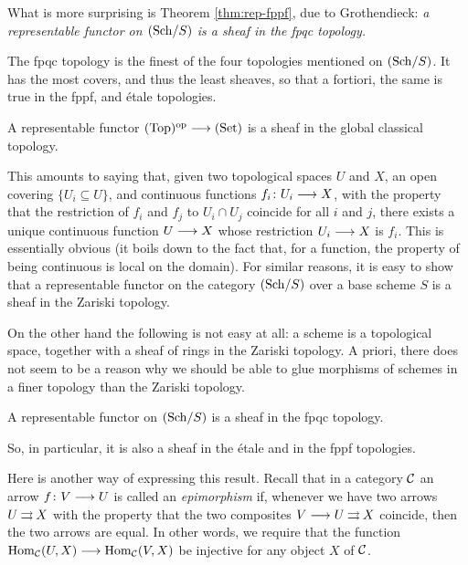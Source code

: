 \begin{2   CONTRAVARIANT FUNCTORS}
\begin{2.3 Sheaves in Grothendieck topologies}
\begin{shaded}
What is more surprising is Theorem \ref{thm:rep-fppf}, due to Grothendieck: 
\textit{a representable functor on $({\mathrm{Sch}/S})$ is a sheaf in the fpqc topology.}

The fpqc topology is the finest of the four topologies mentioned on $({\mathrm{Sch}/S})$. It has the most covers, and thus the least sheaves, so that a fortiori, the same is true in the fppf,  and \'etale topologies.
\end{shaded}


\begin{proposition}\label{prop:rep->sheaf}
A representable functor $\cattop\op \arr \catset$ is a sheaf in the global classical topology.
\end{proposition}

This amounts to saying that, given two topological spaces $U$ and $X$, an open covering $\{U_i \subseteq U\}$, and continuous functions $f_i \colon U_i \arr X$, with the property that the restriction of $f_i$ and $f_j$ to $U_i \cap U_j$ coincide for all $i$ and $j$, there exists a unique continuous function $U \arr X$ whose restriction $U_{i} \arr X$ is $f_{i}$. This is essentially obvious (it boils down to the fact that, for a function, the property of being continuous is local on the domain). For similar reasons, it is easy to show that a representable functor on the category $({\mathrm{Sch}/S})$ over a base scheme $S$ is a sheaf in the Zariski topology.

On the other hand the following is not easy at all: a scheme is a topological space, together with a sheaf of rings in the Zariski topology. A priori, there does not seem to be a reason why we should be able to glue morphisms of schemes in a finer topology than the Zariski topology.


\begin{theorem}[Grothendieck]\label{thm:rep-fppf}
A representable functor on $({\mathrm{Sch}/S})$ is a sheaf in the fpqc topology.
\end{theorem}

So, in particular, it is also a sheaf in the \'etale and in the fppf topologies.

Here is another way of expressing this result. Recall that in a category $\mathcal{C}$ an arrow $f \colon V \arr U$ is called an \emph{epimorphism}%
 if, whenever we have two arrows $U \mathbin{\rightrightarrows} X$ with the property that the two composites $V \arr U \double X$ coincide, then the two arrows are equal. In other words, we require that the function $\hom_{\cC}(U,X) \arr \hom_{\cC}(V,X)$ be injective for any object $X$ of $\mathcal{C}$.


\end{2.3 Sheaves in Grothendieck topologies}
\end{2   CONTRAVARIANT FUNCTORS}

